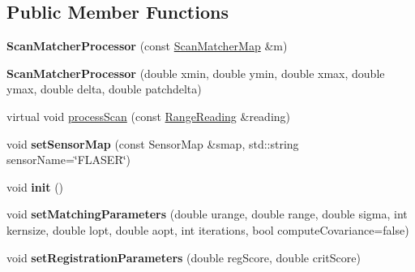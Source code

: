 \subsection*{Public Member Functions}
\begin{DoxyCompactItemize}
\item 
\mbox{\label{classGMapping_1_1ScanMatcherProcessor_ac6b9ed3cfcf73908830e793aba0cfc50}} 
{\bfseries Scan\+Matcher\+Processor} (const \hyperlink{classGMapping_1_1Map}{Scan\+Matcher\+Map} \&m)
\item 
\mbox{\label{classGMapping_1_1ScanMatcherProcessor_a602f5c193d1d7f27e2e270079fe9b3bf}} 
{\bfseries Scan\+Matcher\+Processor} (double xmin, double ymin, double xmax, double ymax, double delta, double patchdelta)
\item 
virtual void \hyperlink{classGMapping_1_1ScanMatcherProcessor_a2b3362047c30befa6f48942a393be799}{process\+Scan} (const \hyperlink{classGMapping_1_1RangeReading}{Range\+Reading} \&reading)
\item 
\mbox{\label{classGMapping_1_1ScanMatcherProcessor_ad2fddfe74f39c3a0ab18efe8a2bd9fbc}} 
void {\bfseries set\+Sensor\+Map} (const Sensor\+Map \&smap, std\+::string sensor\+Name=\char`\"{}F\+L\+A\+S\+ER\char`\"{})
\item 
\mbox{\label{classGMapping_1_1ScanMatcherProcessor_a524dbef1ab93a829d6788950acd70f7f}} 
void {\bfseries init} ()
\item 
\mbox{\label{classGMapping_1_1ScanMatcherProcessor_a24ebe064b922f5bd782013ff64577175}} 
void {\bfseries set\+Matching\+Parameters} (double urange, double range, double sigma, int kernsize, double lopt, double aopt, int iterations, bool compute\+Covariance=false)
\item 
\mbox{\label{classGMapping_1_1ScanMatcherProcessor_a7f39119cb04e7f9393a6efe7ef8bdedf}} 
void {\bfseries set\+Registration\+Parameters} (double reg\+Score, double crit\+Score)
\item 
\mbox{\label{classGMapping_1_1ScanMatcherProcessor_a87416d3eff13fc3b87c683d37f6117ca}} 

\end{DoxyCompactItemize}
